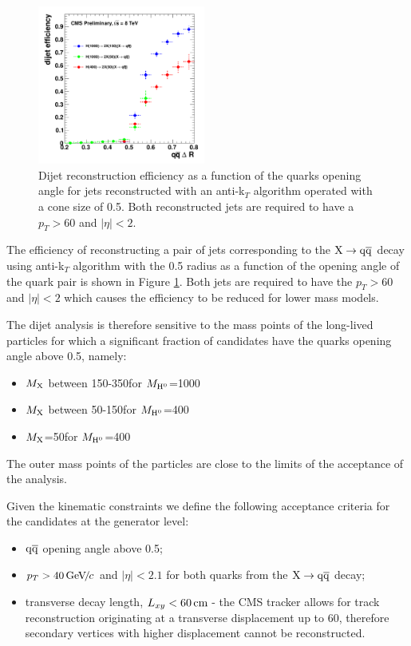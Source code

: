 \begin{figure}[htbp]
\centering
\includegraphics[width=0.49\textwidth]{plots/signal/effDijet.pdf}
\caption{Dijet reconstruction efficiency as a function of the quarks opening angle for jets reconstructed with an
anti-k$_T$ algorithm operated with a cone size of 0.5. Both reconstructed jets are required to have a $p_T>60$\GeVc
and $|\eta|<2$.  \label{fig:effdR}}
\end{figure}

The efficiency of reconstructing a pair of jets
 corresponding to the $\mathrm{X}\rightarrow\mathrm{q}\overline{\mathrm{q}}$ decay using anti-k$_T$ algorithm with the 0.5 radius as a function of the
opening angle of the quark pair is shown in Figure \ref{fig:effdR}. Both jets are required 
to have the $p_T>60$\GeVc and $|\eta|<2$ which causes the 
efficiency to be reduced for lower \Higgs  mass models.
 

The dijet analysis is therefore sensitive to the mass points of the long-lived particles \X for which 
a significant fraction of candidates have the quarks opening angle above 0.5, namely:
\begin{itemize}
\item $M_{\mathrm{X}}$ between 150-350\GeVcc for $M_{\mathrm{H}^{0}}$=1000\GeVcc
\item $M_{\mathrm{X}}$ between 50-150\GeVcc for $M_{\mathrm{H}^{0}}$=400\GeVcc
\item $M_{\mathrm{X}}$=50\GeVcc for $M_{\mathrm{H}^{0}}$=400\GeVcc
\end{itemize}
The outer mass points of the \X particles are close to the limits of the acceptance of the analysis.

Given the kinematic constraints we define the following acceptance criteria 
for the \X candidates at the generator level:
\begin{itemize}
 \item $\mathrm{q}\overline{\mathrm{q}}$ opening angle above 0.5;
 \item $p_T>40{\,\text{Ge\hspace{-.08em}V\hspace{-0.16em}/\hspace{-0.08em}}c}$ and $|\eta|<2.1$ for both quarks from the $\mathrm{X}\rightarrow\mathrm{q}\overline{\mathrm{q}}$ decay;
 \item transverse decay length, $L_{xy}<60\,\text{cm}$ - the CMS tracker allows for track reconstruction originating at
a transverse displacement up to 60\cm, therefore secondary vertices with higher displacement cannot be reconstructed.
\end{itemize}

